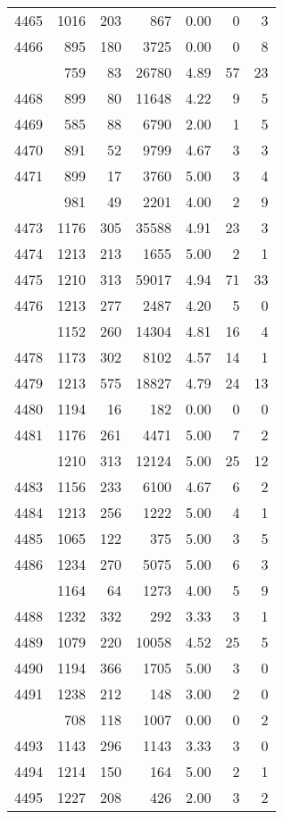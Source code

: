 \documentclass[
]{article}
\begin{document}
\begin{table}
\begin{tabular}[t]{lrrrrrr}
4465 & 1016 & 203 & 867 & 0.00 & 0 & 3\\
4466 & 895 & 180 & 3725 & 0.00 & 0 & 8\\
\addlinespace
4467 & 759 & 83 & 26780 & 4.89 & 57 & 23\\
4468 & 899 & 80 & 11648 & 4.22 & 9 & 5\\
4469 & 585 & 88 & 6790 & 2.00 & 1 & 5\\
4470 & 891 & 52 & 9799 & 4.67 & 3 & 3\\
4471 & 899 & 17 & 3760 & 5.00 & 3 & 4\\
\addlinespace
4472 & 981 & 49 & 2201 & 4.00 & 2 & 9\\
4473 & 1176 & 305 & 35588 & 4.91 & 23 & 3\\
4474 & 1213 & 213 & 1655 & 5.00 & 2 & 1\\
4475 & 1210 & 313 & 59017 & 4.94 & 71 & 33\\
4476 & 1213 & 277 & 2487 & 4.20 & 5 & 0\\
\addlinespace
4477 & 1152 & 260 & 14304 & 4.81 & 16 & 4\\
4478 & 1173 & 302 & 8102 & 4.57 & 14 & 1\\
4479 & 1213 & 575 & 18827 & 4.79 & 24 & 13\\
4480 & 1194 & 16 & 182 & 0.00 & 0 & 0\\
4481 & 1176 & 261 & 4471 & 5.00 & 7 & 2\\
\addlinespace
4482 & 1210 & 313 & 12124 & 5.00 & 25 & 12\\
4483 & 1156 & 233 & 6100 & 4.67 & 6 & 2\\
4484 & 1213 & 256 & 1222 & 5.00 & 4 & 1\\
4485 & 1065 & 122 & 375 & 5.00 & 3 & 5\\
4486 & 1234 & 270 & 5075 & 5.00 & 6 & 3\\
\addlinespace
4487 & 1164 & 64 & 1273 & 4.00 & 5 & 9\\
4488 & 1232 & 332 & 292 & 3.33 & 3 & 1\\
4489 & 1079 & 220 & 10058 & 4.52 & 25 & 5\\
4490 & 1194 & 366 & 1705 & 5.00 & 3 & 0\\
4491 & 1238 & 212 & 148 & 3.00 & 2 & 0\\
\addlinespace
4492 & 708 & 118 & 1007 & 0.00 & 0 & 2\\
4493 & 1143 & 296 & 1143 & 3.33 & 3 & 0\\
4494 & 1214 & 150 & 164 & 5.00 & 2 & 1\\
4495 & 1227 & 208 & 426 & 2.00 & 3 & 2\\

\end{tabular}
\end{table}
\end{document}
